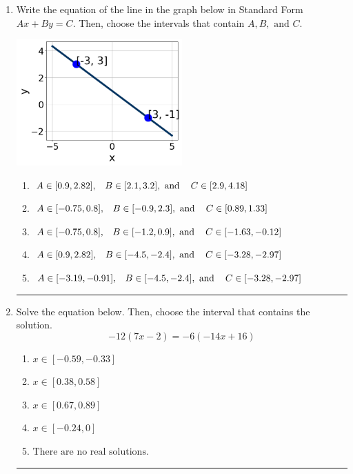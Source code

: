 \documentclass[14pt]{extbook}
\newcommand{\litem}[1]{\item#1\hspace*{-1cm}\rule{\textwidth}{0.4pt}}
\begin{document}
\begin{enumerate}
{\begin{enumerate}[label=\Alph*.]
\end{enumerate} }
\litem{
Write the equation of the line in the graph below in Standard Form $Ax+By=C$. Then, choose the intervals that contain $A, B, \text{ and } C$.
\begin{center}
    \includegraphics[width=0.5\textwidth]{../Figures/linearGraphToStandardCopyC.png}
\end{center}
\begin{enumerate}[label=\Alph*.]
\item \( A \in [0.9, 2.82], \hspace{3mm} B \in [2.1, 3.2], \text{ and } \hspace{3mm} C \in [2.9, 4.18] \)
\item \( A \in [-0.75, 0.8], \hspace{3mm} B \in [-0.9, 2.3], \text{ and } \hspace{3mm} C \in [0.89, 1.33] \)
\item \( A \in [-0.75, 0.8], \hspace{3mm} B \in [-1.2, 0.9], \text{ and } \hspace{3mm} C \in [-1.63, -0.12] \)
\item \( A \in [0.9, 2.82], \hspace{3mm} B \in [-4.5, -2.4], \text{ and } \hspace{3mm} C \in [-3.28, -2.97] \)
\item \( A \in [-3.19, -0.91], \hspace{3mm} B \in [-4.5, -2.4], \text{ and } \hspace{3mm} C \in [-3.28, -2.97] \)

\end{enumerate} }
\litem{
Solve the equation below. Then, choose the interval that contains the solution.\[ -12(7x -2) = -6(-14x + 16) \]\begin{enumerate}[label=\Alph*.]
\item \( x \in [-0.59, -0.33] \)
\item \( x \in [0.38, 0.58] \)
\item \( x \in [0.67, 0.89] \)
\item \( x \in [-0.24, 0] \)
\item \( \text{There are no real solutions.} \)


\end{enumerate}}
\end{enumerate}
\end{document}
